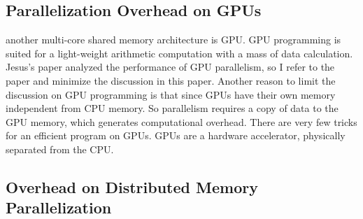\documentclass[12pt]{article}
\begin{document}
\subsection{Parallelization Overhead on GPUs}
another multi-core shared memory architecture is GPU. GPU programming is suited for a light-weight arithmetic computation with a mass of data calculation.
Jesus's paper analyzed the performance of GPU parallelism, so I refer to the paper and minimize the discussion in this paper.
Another reason to limit the discussion on GPU programming is that since GPUs have their own memory independent from CPU memory. So parallelism requires a copy of data to the GPU memory, which generates computational overhead. There are very few tricks for an efficient program on GPUs.
GPUs are a hardware accelerator, physically separated from the CPU.


\subsection{Overhead on Distributed Memory Parallelization}
\end{document}
